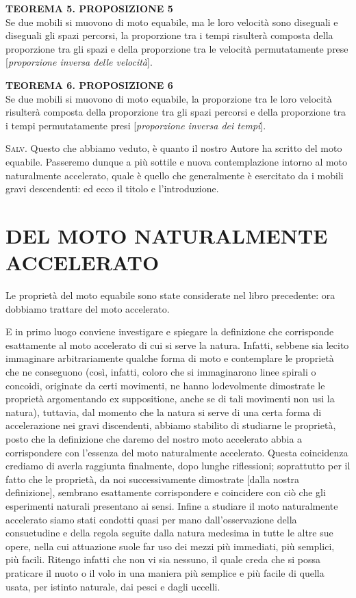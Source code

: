 \documentclass[11pt,twoside,openany]{book}
\newcommand{\speaker}[1]{\textcolor{rubric}{\textsc{#1}}\space}
\begin{document}
\textbf{TEOREMA 5. PROPOSIZIONE 5}\\ Se due mobili si muovono di moto equabile, ma le loro velocità sono diseguali e diseguali gli spazi percorsi, la proporzione tra i tempi risulterà composta della proporzione tra gli spazi e della proporzione tra le velocità permutatamente prese [\emph{proporzione inversa delle velocità}].

\textbf{TEOREMA 6. PROPOSIZIONE 6}\\ Se due mobili si muovono di moto equabile, la proporzione tra le loro velocità risulterà composta della proporzione tra gli spazi percorsi e della proporzione tra i tempi permutatamente presi [\emph{proporzione inversa dei tempi}].

\speaker{Salv.} Questo che abbiamo veduto, è quanto il nostro Autore ha scritto del moto equabile. Passeremo dunque a più sottile e nuova contemplazione intorno al moto naturalmente accelerato, quale è quello che generalmente è esercitato da i mobili gravi descendenti: ed ecco il titolo e l'introduzione.


\section*{DEL MOTO NATURALMENTE ACCELERATO}

Le proprietà del moto equabile sono state considerate nel libro precedente: ora dobbiamo trattare del moto accelerato.

E in primo luogo conviene investigare e spiegare la definizione che corrisponde esattamente al moto accelerato di cui si serve la natura. Infatti, sebbene sia lecito immaginare arbitrariamente qualche forma di moto e contemplare le proprietà che ne conseguono (così, infatti, coloro che si immaginarono linee spirali o concoidi, originate da certi movimenti, ne hanno lodevolmente dimostrate le proprietà argomentando ex suppositione, anche se di tali movimenti non usi la natura), tuttavia, dal momento che la natura si serve di una certa forma di accelerazione nei gravi discendenti, abbiamo stabilito di studiarne le proprietà, posto che la definizione che daremo del nostro moto accelerato abbia a corrispondere con l'essenza del moto naturalmente accelerato. Questa coincidenza crediamo di averla raggiunta finalmente, dopo lunghe riflessioni; soprattutto per il fatto che le proprietà, da noi successivamente dimostrate [dalla nostra definizione], sembrano esattamente corrispondere e coincidere con ciò che gli esperimenti naturali presentano ai sensi. Infine a studiare il moto naturalmente accelerato siamo stati condotti quasi per mano dall'osservazione della consuetudine e della regola seguite dalla natura medesima in tutte le altre sue opere, nella cui attuazione suole far uso dei mezzi più immediati, più semplici, più facili. Ritengo infatti che non vi sia nessuno, il quale creda che si possa praticare il nuoto o il volo in una maniera più semplice e più facile di quella usata, per istinto naturale, dai pesci e dagli uccelli.
\end{document}
